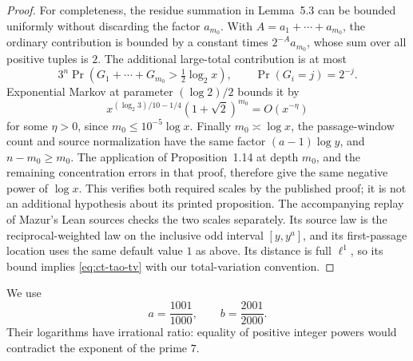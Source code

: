 \documentclass[11pt,a4paper]{article}
\begin{document}
\begin{proof}
For completeness, the residue summation in Lemma~5.3 can be bounded
uniformly without discarding the factor \(a_{m_0}\).
With \(A=a_1+\cdots+a_{m_0}\), the ordinary contribution is bounded
by a constant times \(2^{-A}a_{m_0}\), whose sum over all positive
tuples is \(2\). The additional large-total contribution is at most
\[
 3^n\Pr(G_1+\cdots+G_{m_0}>\tfrac12\log_2x),
 \qquad \Pr(G_i=j)=2^{-j}.
\]
Exponential Markov at parameter \((\log2)/2\) bounds it by
\[
 x^{(\log_2 3)/10-1/4}(1+\sqrt2)^{m_0}=O(x^{-\eta})
\]
for some \(\eta>0\), since \(m_0\le10^{-5}\log x\).
Finally \(m_0\asymp\log x\), the passage-window count and source
normalization have the same factor \((a-1)\log y\), and
\(n-m_0\ge m_0\). The application of Proposition~1.14 at depth
\(m_0\), and the remaining concentration errors in that proof,
therefore give the same negative power of \(\log x\).
This verifies both required scales by the published proof;
it is not an additional hypothesis about its printed proposition.
The accompanying replay of Mazur's Lean sources checks the two
scales separately. Its source law is the reciprocal-weighted law
on the inclusive odd interval \([y,y^a]\), and its first-passage
location uses the same default value \(1\) as above. Its distance
is full \(\ell^1\), so its bound implies
\eqref{eq:ct-tao-tv} with our total-variation convention.
\end{proof}

We use
\begin{equation}\label{eq:ct-two-scales}
 a=\frac{1001}{1000},\qquad b=\frac{2001}{2000}.
\end{equation}
Their logarithms have irrational ratio: equality of positive integer
powers would contradict the exponent of the prime \(7\).
\end{document}
